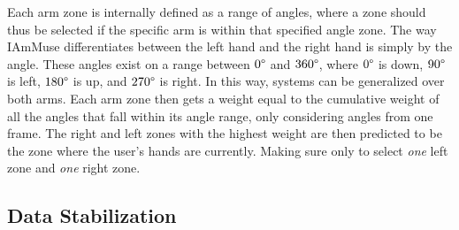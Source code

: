 Each arm zone is internally defined as a range of angles, where a zone should thus be selected if the specific arm is within that specified angle zone.
The way IAmMuse differentiates between the left hand and the right hand is simply by the angle.
These angles exist on a range between $0\degree$ and $360\degree$, where $0\degree$ is down, $90\degree$ is left, $180\degree$ is up, and $270\degree$ is right. 
In this way, systems can be generalized over both arms.
Each arm zone then gets a weight equal to the cumulative weight of all the angles that fall within its angle range, only considering angles from one frame.
The right and left zones with the highest weight are then predicted to be the zone where the user's hands are currently.
Making sure only to select \textit{one} left zone and \textit{one} right zone.


\subsection{Data Stabilization}
\label{sub-section: tracking method - data interpretation - data stabilization}

